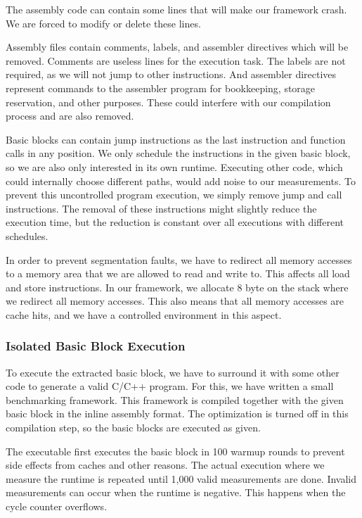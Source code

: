 The assembly code can contain some lines that will make our framework crash.
We are forced to modify or delete these lines.

Assembly files contain comments, labels, and assembler directives which will be removed.
Comments are useless lines for the execution task. 
The labels are not required, as we will not jump to other instructions.
And assembler directives represent commands to the assembler program for bookkeeping, storage reservation, and other purposes.
These could interfere with our compilation process and are also removed.

Basic blocks can contain jump instructions as the last instruction and function calls in any position.
We only schedule the instructions in the given basic block, so we are also only interested in its own runtime.
Executing other code, which could internally choose different paths, would add noise to our measurements.
To prevent this uncontrolled program execution, we simply remove jump and call instructions.
The removal of these instructions might slightly reduce the execution time, but the reduction is constant over all executions with different schedules.

In order to prevent segmentation faults, we have to redirect all memory accesses to a memory area that we are allowed to read and write to.
This affects all load and store instructions.
In our framework, we allocate 8 byte on the stack where we redirect all memory accesses.
This also means that all memory accesses are cache hits, and we have a controlled environment in this aspect.


\subsubsection{Isolated Basic Block Execution}
\label{sec:approach:isol_bb_exec}
\tobechecked
To execute the extracted basic block, we have to surround it with some other code to generate a valid C/C++ program.
For this, we have written a small benchmarking framework.
This framework is compiled together with the given basic block in the inline assembly format.
The optimization is turned off in this compilation step, so the basic blocks are executed as given.

The executable first executes the basic block in 100 warmup rounds to prevent side effects from caches and other reasons.
The actual execution where we measure the runtime is repeated until 1,000 valid measurements are done.
Invalid measurements can occur when the runtime is negative.
This happens when the cycle counter overflows.

